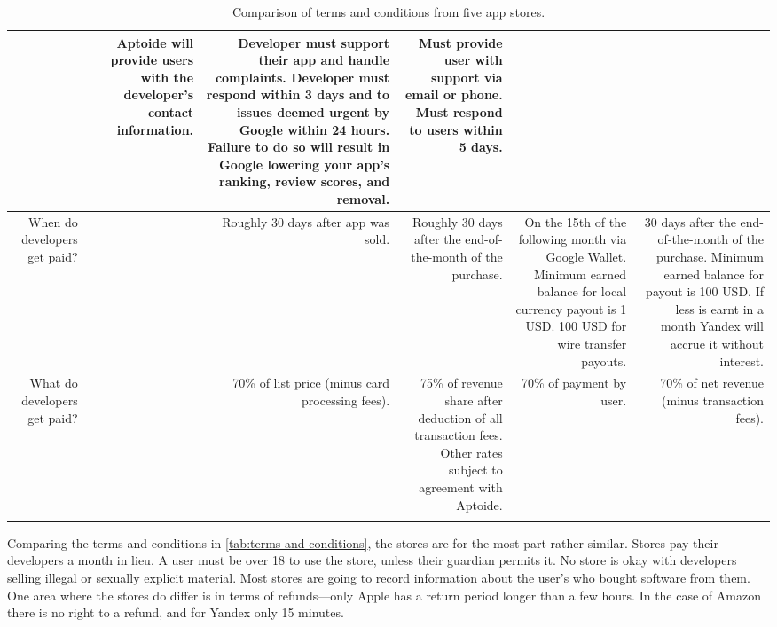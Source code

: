 \documentclass[thesis.tex]{subfiles}
\begin{document}
{{\begin{longtable}{RRRRRR}
      & Aptoide will provide users with the developer's contact information.
      & Developer must support their app and handle complaints.  Developer must respond within 3 days and to issues deemed urgent by Google within 24 hours.  Failure to do so will result in Google lowering your app's ranking, review scores, and removal.
      & Must provide user with support via email or phone.  Must respond to users within 5 days.
      \\\midrule
    When do developers get paid?
      & 
      & Roughly 30 days after app was sold.
      & Roughly 30 days after the end-of-the-month of the purchase.
      & On the 15th of the following month via Google Wallet.  Minimum earned balance for local currency payout is 1 USD. 100 USD for wire transfer payouts.
      & 30 days after the end-of-the-month of the purchase.  Minimum earned balance for payout is 100 USD.  If less is earnt in a month Yandex will accrue it without interest.
      \\\midrule
    What do developers get paid?
      &
      & 70\% of list price (minus card processing fees).
      & 75\% of revenue share after deduction of all transaction fees.  Other rates subject to agreement with Aptoide.
      & 70\% of payment by user.
      & 70\% of net revenue (minus transaction fees).
      \\
    \bottomrule
    \caption{Comparison of terms and conditions from five app stores.}
    \label{tab:terms-and-conditions}
  \end{longtable}
}}

Comparing the terms and conditions in \autoref{tab:terms-and-conditions}, the stores are for the most part rather similar.
Stores pay their developers a month in lieu.  A user must be over 18 to use the store, unless their guardian permits it. 
No store is okay with developers selling illegal or sexually explicit material.
Most stores are going to record information about the user's who bought software from them.
One area where the stores do differ is in terms of refunds---only Apple has a return period longer than a few hours.
In the case of Amazon there is no right to a refund, and for Yandex only 15 minutes.
\end{document}
